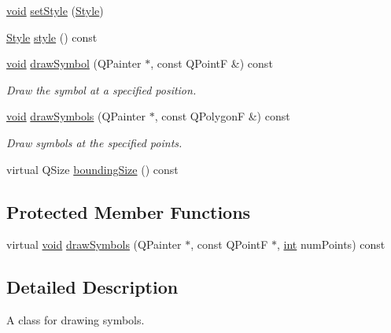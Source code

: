 \begin{DoxyCompactItemize}
\item 
\hyperlink{group___u_a_v_objects_plugin_ga444cf2ff3f0ecbe028adce838d373f5c}{void} \hyperlink{class_qwt_symbol_a4d3b9f3dd8c4ca034694b86372b74eb9}{set\-Style} (\hyperlink{class_qwt_symbol_a62f457952470c2076962e83ef2c24d2f}{Style})
\item 
\hyperlink{class_qwt_symbol_a62f457952470c2076962e83ef2c24d2f}{Style} \hyperlink{class_qwt_symbol_a5e5811e1a1621e617716a2a62578b507}{style} () const 
\item 
\hyperlink{group___u_a_v_objects_plugin_ga444cf2ff3f0ecbe028adce838d373f5c}{void} \hyperlink{class_qwt_symbol_a3403db40a12f2f79f79616cf858ecb1f}{draw\-Symbol} (Q\-Painter $\ast$, const Q\-Point\-F \&) const 
\begin{DoxyCompactList}\small\item\em Draw the symbol at a specified position. \end{DoxyCompactList}\item 
\hyperlink{group___u_a_v_objects_plugin_ga444cf2ff3f0ecbe028adce838d373f5c}{void} \hyperlink{class_qwt_symbol_a249740d6f7e6315e3de0ce6f7ad7020d}{draw\-Symbols} (Q\-Painter $\ast$, const Q\-Polygon\-F \&) const 
\begin{DoxyCompactList}\small\item\em Draw symbols at the specified points. \end{DoxyCompactList}\item 
virtual Q\-Size \hyperlink{class_qwt_symbol_afd1d660a5ddba86095a90b1e157a8840}{bounding\-Size} () const 
\end{DoxyCompactItemize}
\subsection*{Protected Member Functions}
\begin{DoxyCompactItemize}
\item 
virtual \hyperlink{group___u_a_v_objects_plugin_ga444cf2ff3f0ecbe028adce838d373f5c}{void} \hyperlink{class_qwt_symbol_a18c1e4716c4ebc92a28becc86de4d429}{draw\-Symbols} (Q\-Painter $\ast$, const Q\-Point\-F $\ast$, \hyperlink{ioapi_8h_a787fa3cf048117ba7123753c1e74fcd6}{int} num\-Points) const 
\end{DoxyCompactItemize}


\subsection{Detailed Description}
A class for drawing symbols. 

